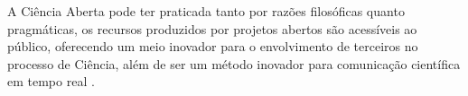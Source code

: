 A Ciência Aberta pode ter praticada tanto por razões filosóficas quanto
pragmáticas, os recursos produzidos por projetos abertos são acessíveis ao
público, oferecendo um meio inovador para o envolvimento de terceiros no
processo de Ciência, além de ser um método inovador para comunicação científica
em tempo real \cite{grand_open_2010}.

